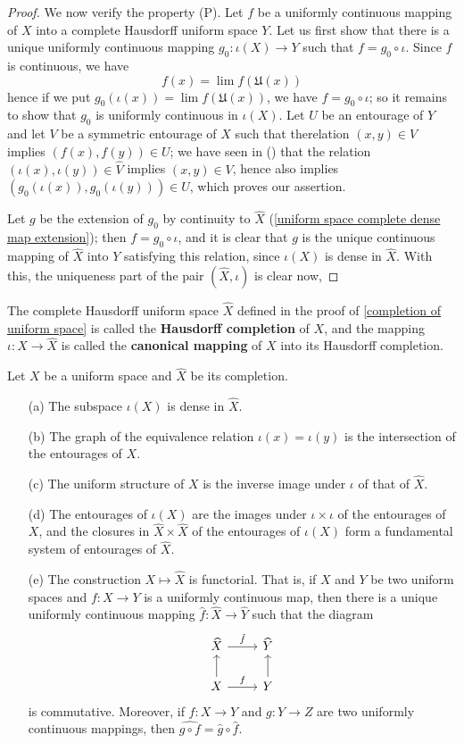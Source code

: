 \begin{proof}
We now verify the property (P). Let $f$ be a uniformly continuous mapping of $X$ into a complete Hausdorff uniform space $Y$. Let us first show that there is a unique uniformly continuous mapping $g_0:\iota(X)\to Y$ such that $f=g_0\circ\iota$. Since $f$ is continuous, we have
\[f(x)=\lim f(\mathfrak{U}(x))\]
hence if we put $g_0(\iota(x))=\lim f(\mathfrak{U}(x))$, we have $f=g_0\circ\iota$; so it remains to show that $g_0$ is uniformly continuous in $\iota(X)$. Let $U$ be an entourage of $Y$ and let $V$ be a symmetric entourage of $X$ such that therelation $(x,y)\in V$ implies $(f(x),f(y))\in U$; we have seen in () that the relation $(\iota(x),\iota(y))\in\widehat{V}$ implies $(x,y)\in V$, hence also implies $(g_0(\iota(x)),g_0(\iota(y)))\in U$, which proves our assertion.\par
Let $g$ be the extension of $g_0$ by continuity to $\widehat{X}$ (\cref{uniform space complete dense map extension}); then $f=g_0\circ\iota$, and it is clear that $g$ is the unique continuous mapping of $\widehat{X}$ into $Y$ satisfying this relation, since $\iota(X)$ is dense in $\widehat{X}$. With this, the uniqueness part of the pair $(\widehat{X},\iota)$ is clear now,
\end{proof}
\begin{definition}
The complete Hausdorff uniform space $\widehat{X}$ defined in the proof of \cref{completion of uniform space} is called the \textbf{Hausdorff completion} of $X$, and the mapping $\iota:X\to\widehat{X}$ is called the \textbf{canonical mapping} of $X$ into its Hausdorff completion.
\end{definition}
\begin{proposition}\label{uniform space completion prop}
Let $X$ be a uniform space and $\widehat{X}$ be its completion.
\begin{itemize}
\item[(a)] The subspace $\iota(X)$ is dense in $\widehat{X}$.
\item[(b)] The graph of the equivalence relation $\iota(x)=\iota(y)$ is the intersection of the entourages of $X$.
\item[(c)] The uniform structure of $X$ is the inverse image under $\iota$ of that of $\widehat{X}$.
\item[(d)] The entourages of $\iota(X)$ are the images under $\iota\times\iota$ of the entourages of $X$, and the closures in $\widehat{X}\times\widehat{X}$ of the entourages of $\iota(X)$ form a fundamental system of entourages of $\widehat{X}$.
\item[(e)] The construction $X\mapsto\widehat{X}$ is functorial. That is, if $X$ and $Y$ be two uniform spaces and $f:X\to Y$ is a uniformly continuous map, then there is a unique uniformly continuous mapping $\hat{f}:\widehat{X}\to\widehat{Y}$ such that the diagram
\[\begin{tikzcd}
\widehat{X}\ar[r,"\hat{f}"]&\widehat{Y}\\
X\ar[u]\ar[r,"f"]&Y\ar[u]
\end{tikzcd}\]
is commutative. Moreover, if $f:X\to Y$ and $g:Y\to Z$ are two uniformly continuous mappings, then $\widehat{g\circ f}=\hat{g}\circ\hat{f}$.
\end{itemize}
\end{proposition}
